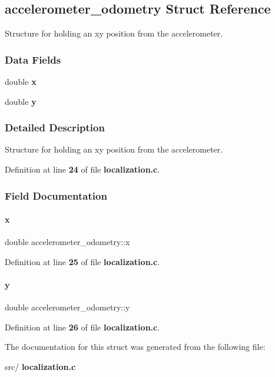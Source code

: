 \subsection{accelerometer\+\_\+odometry Struct Reference}
\label{structaccelerometer__odometry}


Structure for holding an xy position from the accelerometer.  


\subsubsection*{Data Fields}
\begin{DoxyCompactItemize}
\item 
double \textbf{ x}
\item 
double \textbf{ y}
\end{DoxyCompactItemize}


\subsubsection{Detailed Description}
Structure for holding an xy position from the accelerometer. 

Definition at line \textbf{ 24} of file \textbf{ localization.\+c}.



\subsubsection{Field Documentation}
\mbox{\label{structaccelerometer__odometry_a83af671d99413a7c480678d5abb9c64a}} 
\paragraph{x}
{\footnotesize\ttfamily double accelerometer\+\_\+odometry\+::x}



Definition at line \textbf{ 25} of file \textbf{ localization.\+c}.

\mbox{\label{structaccelerometer__odometry_a4d812f516efdd477ae9f74fca2a07a2b}} 
\paragraph{y}
{\footnotesize\ttfamily double accelerometer\+\_\+odometry\+::y}



Definition at line \textbf{ 26} of file \textbf{ localization.\+c}.



The documentation for this struct was generated from the following file\+:\begin{DoxyCompactItemize}
\item 
src/\textbf{ localization.\+c}\end{DoxyCompactItemize}
